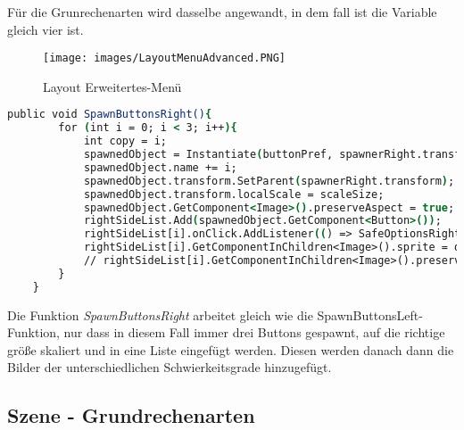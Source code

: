 Für die Grunrechenarten wird dasselbe angewandt, in dem fall ist die Variable gleich vier ist.
\begin{figure}[htbp]
  \centering
  \texttt{[image: images/LayoutMenuAdvanced.PNG]}
  \caption{Layout Erweitertes-Menü}
  \label{layoutAdvancedMenu}
\end{figure}
\begin{lstlisting}[language=csh, caption={MenuPickLevelAdvanced.cs SpawnButtonsRight-Funktion}]
	public void SpawnButtonsRight(){
		for (int i = 0; i < 3; i++){
			int copy = i;
			spawnedObject = Instantiate(buttonPref, spawnerRight.transform.position, Quaternion.identity);
			spawnedObject.name += i;
			spawnedObject.transform.SetParent(spawnerRight.transform);
			spawnedObject.transform.localScale = scaleSize;
			spawnedObject.GetComponent<Image>().preserveAspect = true;
			rightSideList.Add(spawnedObject.GetComponent<Button>());
			rightSideList[i].onClick.AddListener(() => SafeOptionsRight(copy));
			rightSideList[i].GetComponentInChildren<Image>().sprite = difficulty[i];
			// rightSideList[i].GetComponentInChildren<Image>().preserveAspect = true;
		}
	}
\end{lstlisting}
Die Funktion \textit{SpawnButtonsRight} arbeitet gleich wie die SpawnButtonsLeft-Funktion, nur dass in diesem Fall immer drei Buttons gespawnt, auf die richtige größe skaliert und in eine Liste eingefügt werden. Diesen werden danach dann die Bilder der unterschiedlichen Schwierkeitsgrade hinzugefügt.
\subsection{Szene - Grundrechenarten}
